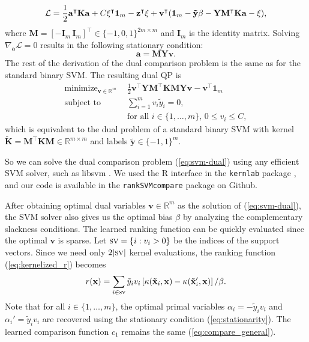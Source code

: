\documentclass[twoside,11pt]{article}
\newcommand{\sv}{\textsc{sv}}
\newcommand{\RR}{\mathbb R}
\DeclareMathOperator*{\minimize}{minimize}
\begin{document}
\begin{equation}
  \label{eq:lagrangian}
  \mathcal L = \frac 1 2 \mathbf a^\intercal \mathbf K \mathbf a + 
  C\mathbf \xi^\intercal\mathbf  1_{m}\\
  -\mathbf z^\intercal \mathbf \xi
  + \mathbf v^\intercal(\mathbf 1_m - \mathbf{\tilde y}\beta
  - \mathbf Y \mathbf M^\intercal \mathbf K\mathbf  a - \xi),
\end{equation}
where $\mathbf M=[-\mathbf I_m \, \mathbf
I_m]^\intercal\in\{-1,0,1\}^{2m\times m}$ and $\mathbf I_m$ is the
identity matrix. Solving $\nabla_{\mathbf a} \mathcal L=0$ results in
the following stationary condition:
\begin{equation}
  \label{eq:stationarity}
  \mathbf a = \mathbf M \mathbf Y \mathbf v.
\end{equation}
The rest of the derivation of the dual comparison problem is the same
as for the standard binary SVM. The resulting dual QP is
\begin{equation}
  \begin{aligned}
    \label{eq:svm-dual}
    \minimize_{\mathbf v\in\RR^m}\ \ &
    \frac 1 2 \mathbf v^\intercal \mathbf Y \mathbf M^\intercal 
    \mathbf K \mathbf M \mathbf Y \mathbf v - \mathbf v^\intercal \mathbf 1_m\\
    \text{subject to}\ \ &
    \sum_{i=1}^m v_i \tilde y_i = 0,\\
    & \text{for all $i\in\{1,\dots,m\}$, } 0\leq v_i\leq C,
  \end{aligned}
\end{equation}
which is equivalent to the dual problem of a standard binary SVM with
kernel $\mathbf{\tilde K} = \mathbf M^\intercal \mathbf K \mathbf
M\in\RR^{m\times m}$ and labels $\mathbf{\tilde y}\in\{-1,1\}^m$.

So we can solve the dual comparison problem (\ref{eq:svm-dual}) using
any efficient SVM solver, such as libsvm \citep{libsvm}. We used the R
interface in the \texttt{kernlab} package \citep{kernlab}, and our
code is available in the \texttt{rankSVMcompare} package on Github.

After obtaining optimal dual variables $\mathbf v\in\RR^m$ as the solution of
(\ref{eq:svm-dual}), the SVM solver also gives us the optimal bias
$\beta$ by analyzing the complementary slackness conditions.
The learned ranking function can be quickly evaluated since the
optimal $\mathbf v$ is sparse. Let $\sv =\{i: v_i > 0\}$ be the indices
of the support vectors. Since we need only $2|\sv |$ kernel
evaluations, the ranking function (\ref{eq:kernelized_r}) becomes
\begin{equation}
  \label{eq:r_sv}
  r(\mathbf x)= 
  \sum_{i\in \sv }
  \tilde y_i v_i\left[ 
    \kappa(\mathbf{\tilde x}_i, \mathbf x)
    - \kappa(\mathbf{\tilde x}_i', \mathbf x)
  \right]/\beta.
\end{equation}
Note that for all $i\in\{1,\dots,m\}$, the optimal primal variables
$\alpha_i=-\tilde y_i v_i$ and $\alpha_i'=\tilde y_i v_i$ are
recovered using the stationary condition (\ref{eq:stationarity}). The
learned comparison function $c_1$ remains the same (\ref{eq:compare_general}).
\end{document}
